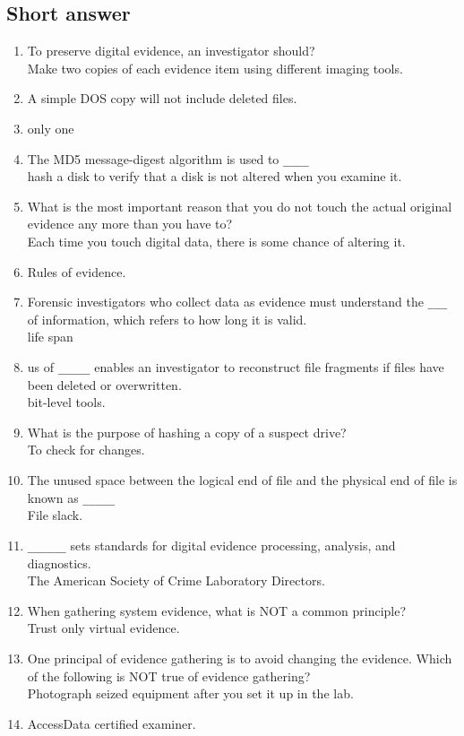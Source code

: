 \subsection{Short answer}
\begin{enumerate}
    \item To preserve digital evidence, an investigator should?\\Make two copies of each evidence item using different imaging tools.
    \item A simple DOS copy will not include deleted files.
    \item only one
    \item The MD5 message-digest algorithm is used to \verb|____|\\hash a disk to verify that a disk is not altered when you examine it.
    \item What is the most important reason that you do not touch the actual original evidence any more than you have to?\\Each time you touch digital data, there is some chance of altering it.
    \item Rules of evidence.
    \item Forensic investigators who collect data as evidence must understand the \verb|___| of information, which refers to how long it is valid.\\life span
    \item us of \verb|_____| enables an investigator to reconstruct file fragments if files have been deleted or overwritten.\\bit-level tools.
    \item What is the purpose of hashing a copy of a suspect drive?\\To check for changes.
    \item The unused space between the logical end of file and the physical end of file is known as \verb|_____|\\ File slack.
    \item \verb|______| sets standards for digital evidence processing, analysis, and diagnostics.\\The American Society of Crime Laboratory Directors.
    \item When gathering system evidence, what is NOT a common principle?\\Trust only virtual evidence.
    \item One principal of evidence gathering is to avoid changing the evidence. Which of the following is NOT true of evidence gathering?\\Photograph seized equipment after you set it up in the lab.
    \item AccessData certified examiner.
\end{enumerate}